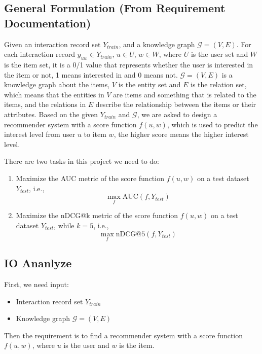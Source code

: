 \documentclass[lettersize,journal]{IEEEtran}
\begin{document}
\subsection{General Formulation (From Requirement Documentation)}

Given an interaction record set $Y_{train}$, and a knowledge graph $\mathcal{G} = (V, E)$. For each interaction record $y_{uw} \in Y_{train}$, $u \in U$, $w \in W$, where $U$ is the user set and $W$ is the item set, it is a 0/1 value that represents whether the user is interested in the item or not, 1 means interested in and 0 means not. $\mathcal{G} = (V, E)$ is a knowledge graph about the items, $V$ is the entity set and $E$ is the relation set, which means that the entities in $V$ are items and something that is related to the items, and the relations in $E$ describe the relationship between the items or their attributes. Based on the given $Y_{train}$ and $\mathcal{G}$, we are asked to design a recommender system with a score function $f(u, w)$, which is used to predict the interest level from user $u$ to item $w$, the higher score means the higher interest level.

There are two tasks in this project we need to do:

\begin{enumerate}
    \item Maximize the AUC metric of the score function $f(u, w)$ on a test dataset $Y_{test}$, i.e., 
    $$\max_f \text{AUC}(f, Y_{test})$$
    \item Maximize the nDCG@k metric of the score function $f(u, w)$ on a test dataset $Y_{test}$, while $k = 5$, i.e., 
    $$\max_f \text{nDCG@}5(f, Y_{test})$$
\end{enumerate}

\subsection{IO Ananlyze}

First, we need input:

\begin{itemize}
    \item Interaction record set $Y_{train}$
    \item Knowledge graph $\mathcal{G}=(V,E)$
\end{itemize}

Then the requirement is to find a recommender system with a score function $f(u ,w)$, where $u$ is the user and $w$ is the item.
\end{document}
